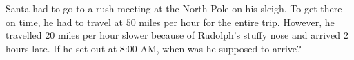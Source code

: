 Santa had to go to a rush meeting at the North Pole on his sleigh. To get there on time, he had to travel at $50$ miles per hour for the entire trip. However, he travelled $20$ miles per hour slower because of Rudolph's stuffy nose and arrived $2$ hours late. If he set out at 8:00 AM, when was he supposed to arrive?

